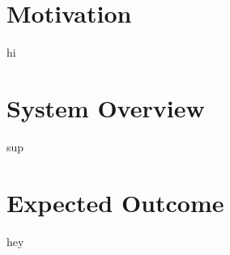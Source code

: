 \documentclass[11pt]{extarticle}
\title{\deliv{\pp}{Report}}
\author{\names}
\date{2017-01-29}
\begin{document}
\maketitle
\tableofcontents


\section{Motivation}

hi


\section{System Overview}

sup


\section{Expected Outcome}

hey

\end{document}
